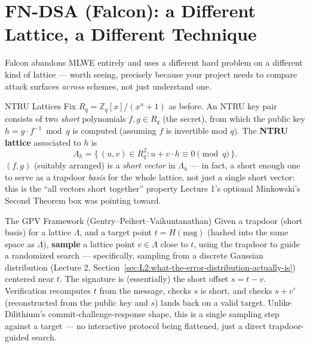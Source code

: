 \section{FN-DSA (Falcon): a Different Lattice, a Different Technique}
\label{sec:L4:fn-dsa-falcon-a-different-lattice-a-diff}

Falcon abandons MLWE entirely and uses a different hard problem on a different kind of lattice --- worth seeing, precisely because your project needs to compare attack surfaces \emph{across} schemes, not just understand one.

\begin{defbox}{NTRU Lattices}
Fix $R_q = \mathbb{Z}_q[x]/(x^n+1)$ as before. An NTRU key pair consists of two \emph{short} polynomials $f,g \in R_q$ (the secret), from which the public key $h = g\cdot f^{-1} \bmod q$ is computed (assuming $f$ is invertible mod $q$). The \textbf{NTRU lattice} associated to $h$ is
$$
\Lambda_h = \{\, (u,v) \in R_q^2 : u + v\cdot h \equiv 0 \!\!\pmod q \,\}.
$$
$(f,g)$ (suitably arranged) is a \emph{short vector} in $\Lambda_h$ --- in fact, a short enough one to serve as a trapdoor \emph{basis} for the whole lattice, not just a single short vector: this is the ``all vectors short together'' property Lecture 1's optional Minkowski's Second Theorem box was pointing toward.
\end{defbox}

\begin{defbox}{The GPV Framework (Gentry--Peikert--Vaikuntanathan)}
Given a trapdoor (short basis) for a lattice $\Lambda$, and a target point $t = H(\text{msg})$ (hashed into the same space as $\Lambda$), \textbf{sample} a lattice point $v \in \Lambda$ close to $t$, using the trapdoor to guide a randomized search --- specifically, sampling from a discrete Gaussian distribution (Lecture 2, Section~\ref{sec:L2:what-the-error-distribution-actually-is}) centered near $t$. The signature is (essentially) the short offset $s = t - v$. Verification recomputes $t$ from the message, checks $s$ is short, and checks $s+v'$ (reconstructed from the public key and $s$) lands back on a valid target. Unlike Dilithium's commit-challenge-response shape, this is a single sampling step against a target --- no interactive protocol being flattened, just a direct trapdoor-guided search.
\end{defbox}

